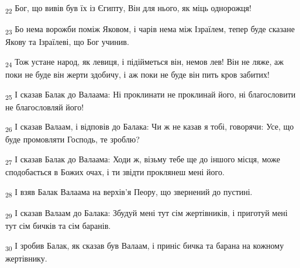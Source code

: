 \begin{tcolorbox}
\textsubscript{22} Бог, що вивів був їх із Єгипту, Він для нього, як міць однорожця!
\end{tcolorbox}
\begin{tcolorbox}
\textsubscript{23} Бо нема ворожби поміж Яковом, і чарів нема між Ізраїлем, тепер буде сказане Якову та Ізраїлеві, що Бог учинив.
\end{tcolorbox}
\begin{tcolorbox}
\textsubscript{24} Тож устане народ, як левиця, і підійметься він, немов лев! Він не ляже, аж поки не буде він жерти здобичу, і аж поки не буде він пить кров забитих!
\end{tcolorbox}
\begin{tcolorbox}
\textsubscript{25} І сказав Балак до Валаама: Ні проклинати не проклинай його, ні благословити не благословляй його!
\end{tcolorbox}
\begin{tcolorbox}
\textsubscript{26} І сказав Валаам, і відповів до Балака: Чи ж не казав я тобі, говорячи: Усе, що буде промовляти Господь, те зроблю?
\end{tcolorbox}
\begin{tcolorbox}
\textsubscript{27} І сказав Балак до Валаама: Ходи ж, візьму тебе ще до іншого місця, може сподобається в Божих очах, і ти звідти проклянеш мені його.
\end{tcolorbox}
\begin{tcolorbox}
\textsubscript{28} І взяв Балак Валаама на верхів'я Пеору, що звернений до пустині.
\end{tcolorbox}
\begin{tcolorbox}
\textsubscript{29} І сказав Валаам до Балака: Збудуй мені тут сім жертівників, і приготуй мені тут сім бичків та сім баранів.
\end{tcolorbox}
\begin{tcolorbox}
\textsubscript{30} І зробив Балак, як сказав був Валаам, і приніс бичка та барана на кожному жертівнику.
\end{tcolorbox}
